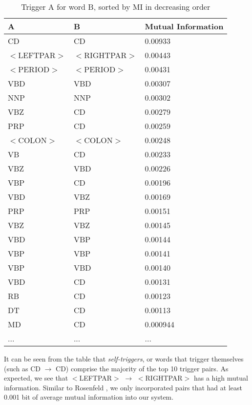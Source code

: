 \documentclass[11pt]{article}
\begin{document}
\begin{table*}[h!]
\begin{small}
\begin{center}
\caption{Trigger {\sf A} for word {\sf B}, sorted by MI in decreasing order}
\label{t:triggerpairs}
\begin{tabular}{|l|l|l|}
\hline
{\sf A} & {\sf B} & {\sf Mutual Information} \\
\hline
CD & CD & 0.00933 \\
$<$LEFTPAR$>$ & $<$RIGHTPAR$>$ & 0.00443 \\
$<$PERIOD$>$ & $<$PERIOD$>$ & 0.00431 \\
VBD & VBD & 0.00307 \\
NNP & NNP & 0.00302 \\
VBZ & CD & 0.00279 \\
PRP & CD & 0.00259 \\
$<$COLON$>$ & $<$COLON$>$ & 0.00248 \\
VB & CD & 0.00233 \\
VBZ & VBD & 0.00226 \\
VBP & CD & 0.00196 \\
VBD & VBZ & 0.00169 \\
PRP & PRP & 0.00151 \\
VBZ & VBZ & 0.00145 \\
VBD & VBP & 0.00144 \\
VBP & VBP & 0.00141 \\
VBP & VBD & 0.00140 \\
VBD & CD & 0.00131 \\
RB & CD & 0.00123 \\
DT & CD & 0.00113 \\
MD & CD & 0.000944 \\
... & ... & ... \\
\hline
\end{tabular}\vspace*{-5mm}
\end{center}
\end{small}
\end{table*}

It can be seen from the table that {\em self-triggers}, or words that trigger themselves (such as CD $\rightarrow$ CD) comprise the majority of the top 10 trigger pairs.
As expected, we see that $<$LEFTPAR$>$ $\rightarrow$ $<$RIGHTPAR$>$ has a high mutual information.
Similar to Rosenfeld \cite{rosenfeld1996}, we only incorporated pairs that had at least 0.001 bit of average mutual information into our system.
\end{document}

